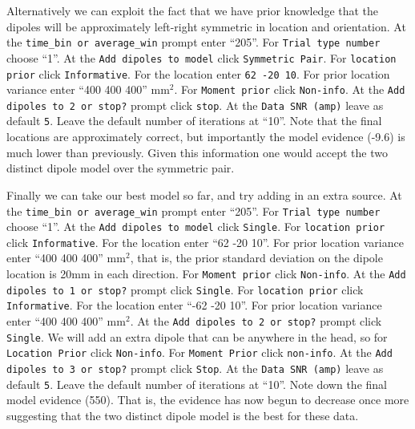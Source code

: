 Alternatively we can exploit the fact that we have prior knowledge that the dipoles will be approximately left-right symmetric in location and orientation. At the \texttt{time\_bin or average\_win} prompt enter ``205''.  For \texttt{Trial type number} choose ``1''. At the \texttt{Add dipoles to model} click \texttt{Symmetric Pair}. For \texttt{location prior} click \texttt{Informative}. For the location enter \texttt{62 -20 10}. For prior location variance enter ``400 400 400'' mm$^2$. For \texttt{Moment prior} click \texttt{Non-info}. At the \texttt{Add dipoles to 2 or stop?} prompt click \texttt{stop}. At the \texttt{Data SNR (amp)} leave as default \texttt{5}. Leave the default number of iterations at ``10''. Note that the final locations are approximately correct, but importantly the model evidence (-9.6) is much lower than previously. Given this information one would accept the two distinct dipole model over the symmetric pair. 

Finally we can take our best model so far, and try adding in an extra source.
At the \texttt{time\_bin or average\_win} prompt enter ``205''. For \texttt{Trial type number} choose ``1''. At the \texttt{Add dipoles to model} click \texttt{Single}. For \texttt{location prior} click \texttt{Informative}. For the location enter ``62 -20 10''. For prior location variance enter ``400 400 400'' mm$^2$, that is, the prior standard deviation on the dipole location is 20mm in each direction. For \texttt{Moment prior} click \texttt{Non-info}. At the \texttt{Add dipoles to 1 or stop?} prompt click \texttt{Single}. For \texttt{location prior} click \texttt{Informative}. For the location enter ``-62 -20 10''. For prior location variance enter ``400 400 400'' mm$^2$. At the \texttt{Add dipoles to 2 or stop?} prompt click \texttt{Single}. We will add an extra dipole that can be anywhere in the head, so for \texttt{Location Prior} click \texttt{Non-info}. For \texttt{Moment Prior} click \texttt{non-info}. At the \texttt{Add dipoles to 3 or stop?} prompt click \texttt{Stop}. At the \texttt{Data SNR (amp)} leave as default \texttt{5}. Leave the default number of iterations at ``10''. Note down the final model evidence (550). That is, the evidence has now begun to decrease once more suggesting that the two distinct dipole model is the best for these data.

